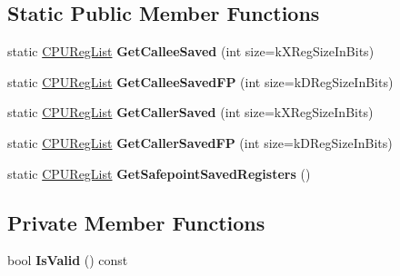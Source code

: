 \subsection*{Static Public Member Functions}
\begin{DoxyCompactItemize}
\item 
static \hyperlink{classv8_1_1internal_1_1_c_p_u_reg_list}{C\+P\+U\+Reg\+List} {\bfseries Get\+Callee\+Saved} (int size=k\+X\+Reg\+Size\+In\+Bits)\hypertarget{classv8_1_1internal_1_1_c_p_u_reg_list_aa93111752064f4cf3890d07338fadaf3}{}\label{classv8_1_1internal_1_1_c_p_u_reg_list_aa93111752064f4cf3890d07338fadaf3}

\item 
static \hyperlink{classv8_1_1internal_1_1_c_p_u_reg_list}{C\+P\+U\+Reg\+List} {\bfseries Get\+Callee\+Saved\+FP} (int size=k\+D\+Reg\+Size\+In\+Bits)\hypertarget{classv8_1_1internal_1_1_c_p_u_reg_list_a6f423c3129aa440155671b5a2da2adbd}{}\label{classv8_1_1internal_1_1_c_p_u_reg_list_a6f423c3129aa440155671b5a2da2adbd}

\item 
static \hyperlink{classv8_1_1internal_1_1_c_p_u_reg_list}{C\+P\+U\+Reg\+List} {\bfseries Get\+Caller\+Saved} (int size=k\+X\+Reg\+Size\+In\+Bits)\hypertarget{classv8_1_1internal_1_1_c_p_u_reg_list_a2ee8023b6245eccd0e20254237dfab75}{}\label{classv8_1_1internal_1_1_c_p_u_reg_list_a2ee8023b6245eccd0e20254237dfab75}

\item 
static \hyperlink{classv8_1_1internal_1_1_c_p_u_reg_list}{C\+P\+U\+Reg\+List} {\bfseries Get\+Caller\+Saved\+FP} (int size=k\+D\+Reg\+Size\+In\+Bits)\hypertarget{classv8_1_1internal_1_1_c_p_u_reg_list_aed4f94d2775a7167b4346f53da5f4216}{}\label{classv8_1_1internal_1_1_c_p_u_reg_list_aed4f94d2775a7167b4346f53da5f4216}

\item 
static \hyperlink{classv8_1_1internal_1_1_c_p_u_reg_list}{C\+P\+U\+Reg\+List} {\bfseries Get\+Safepoint\+Saved\+Registers} ()\hypertarget{classv8_1_1internal_1_1_c_p_u_reg_list_a4d6b95883ff0eab27f43bf9da8f3e621}{}\label{classv8_1_1internal_1_1_c_p_u_reg_list_a4d6b95883ff0eab27f43bf9da8f3e621}

\end{DoxyCompactItemize}
\subsection*{Private Member Functions}
\begin{DoxyCompactItemize}
\item 
bool {\bfseries Is\+Valid} () const \hypertarget{classv8_1_1internal_1_1_c_p_u_reg_list_a446d3a2404a2c6627b5ae02d7d26d77a}{}\label{classv8_1_1internal_1_1_c_p_u_reg_list_a446d3a2404a2c6627b5ae02d7d26d77a}

\end{DoxyCompactItemize}
